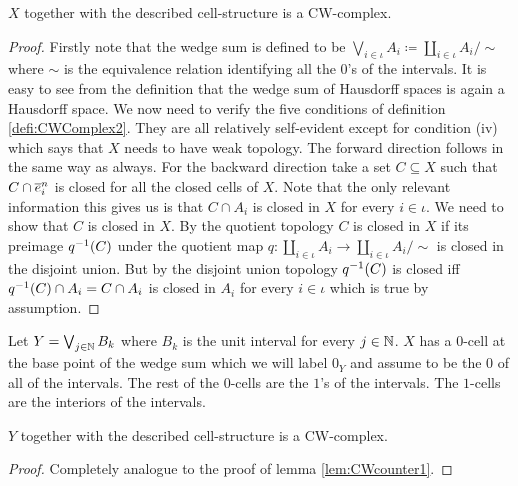 \begin{lem} \label{lem:CWcounter1}
    $X$ together with the described cell-structure is a CW-complex.
\end{lem}
\begin{proof}
    Firstly note that the wedge sum is defined to be $\bigvee_{i \in \iota} A_i \coloneq \coprod_{i \in \iota} A_i / \sim$ where $\sim$ is the equivalence relation identifying all the $0$'s of the intervals. 
    It is easy to see from the definition that the wedge sum of Hausdorff spaces is again a Hausdorff space. 
    We now need to verify the five conditions of definition \ref{defi:CWComplex2}. 
    They are all relatively self-evident except for condition (iv) which says that $X$ needs to have weak topology. 
    The forward direction follows in the same way as always. 
    For the backward direction take a set $C \subseteq X$ such that $C \cap \closedCell{n}{i}$ is closed for all the closed cells of $X$. 
    Note that the only relevant information this gives us is that $C \cap A_i$ is closed in $X$ for every $i \in \iota$.
    We need to show that $C$ is closed in $X$. 
    By the quotient topology $C$ is closed in $X$ if its preimage $\preim{q}{C}$ under the quotient map $q \colon \coprod_{i \in \iota} A_i \to \coprod_{i \in \iota} A_i / \sim$ is closed in the disjoint union. 
    But by the disjoint union topology $\preim{q}{C}$ is closed iff $\preim{q}{C} \cap A_i = C \cap A_i$ is closed in $A_i$ for every $i \in \iota$ which is true by assumption. 
\end{proof}

\begin{defi}
    Let $Y = \bigvee_{j \in \bN}B_k$ where $B_k$ is the unit interval for every $j \in \bN$.
    $X$ has a $0$-cell at the base point of the wedge sum which we will label $0_Y$ and assume to be the $0$ of all of the intervals. The rest of the $0$-cells are the $1$'s of the intervals. 
    The $1$-cells are the interiors of the intervals. 
\end{defi}

\begin{lem}
    $Y$ together with the described cell-structure is a CW-complex.
\end{lem}
\begin{proof}
    Completely analogue to the proof of lemma \ref{lem:CWcounter1}.
\end{proof}

